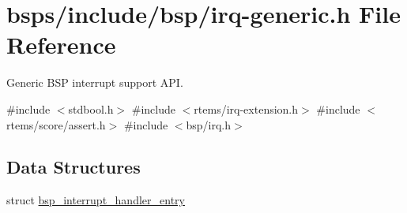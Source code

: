 \hypertarget{irq-generic_8h}{}\section{bsps/include/bsp/irq-\/generic.h File Reference}
\label{irq-generic_8h}


Generic B\+SP interrupt support A\+PI.  


{\ttfamily \#include $<$stdbool.\+h$>$}\newline
{\ttfamily \#include $<$rtems/irq-\/extension.\+h$>$}\newline
{\ttfamily \#include $<$rtems/score/assert.\+h$>$}\newline
{\ttfamily \#include $<$bsp/irq.\+h$>$}\newline
\subsection*{Data Structures}
\begin{DoxyCompactItemize}
\item 
struct \mbox{\hyperlink{structbsp__interrupt__handler__entry}{bsp\+\_\+interrupt\+\_\+handler\+\_\+entry}}
\end{DoxyCompactItemize}
